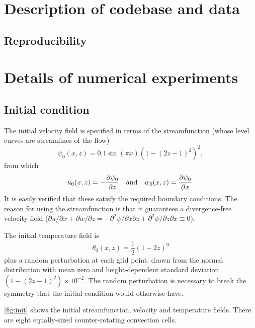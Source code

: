 \documentclass[../main.tex]{subfiles}
\begin{document}
\ifSubfilesClassLoaded{
    \frontmatter
    \tableofcontents
    \mainmatter
}{}

\appendix
\chapter{Description of codebase and data} \label{chap:computations}

\section{Reproducibility}


\chapter{Details of numerical experiments} \label{chap:details}


\section{Initial condition} \label{sec:initial_condition}
The initial velocity field is specified in terms of the streamfunction
(whose level curves are streamlines of the flow)
\[
    \psi_0(x, z) = 0.1 \sin(\pi x) (1 - (2z - 1)^2)^2,
\]
from which
\[
    u_0(x, z) = -\frac{\partial \psi_0}{\partial z}
    \quad \text{and} \quad
    w_0(x, z) = \frac{\partial \psi_0}{\partial x}.
\]
It is easily verified that these satisfy the required boundary conditions. The
reason for using the streamfunction is that it guarantees a divergence-free
velocity field ($\partial u /\partial x + \partial w /\partial z = -\partial^2
\psi/\partial x \partial z + \partial^2 \psi/\partial z \partial x \equiv 0$).

The initial temperature field is
\[
    \theta_0(x, z) = \frac{1}{2} (1 - 2z)^9
\]
plus a random perturbation at each grid point, drawn from the normal
distribution with mean zero and height-dependent standard deviation
$(1 - (2z - 1)^2) \times 10^{-2}$. The random perturbation is necessary to
break the symmetry that the initial condition would otherwise have.

\cref{fig:init} shows the initial streamfunction, velocity and temperature
fields. There are eight equally-sized counter-rotating convection cells.
\end{document}
